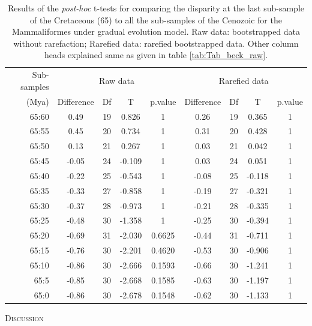 \documentclass[12pt,letterpaper]{article}
\renewcommand{\section}[1]{%
\bigskip
\begin{center}
\begin{Large}
\normalfont\scshape #1
\medskip
\end{Large}
\end{center}}
\begin{document}
\begin{table}[ht]
\caption{Results of the \textit{post-hoc} t-tests for comparing the disparity at the last sub-sample of the Cretaceous (65) to all the sub-samples of the Cenozoic for the Mammaliformes \citep[data from][]{Slater2012MEE} under gradual evolution model. Raw data: bootstrapped data without rarefaction; Rarefied data: rarefied bootstrapped data. Other column heads explained same as given in table \ref{tab:Tab_beck_raw}.}
\label{tab:Tab_slater}
\centering
\begin{tabular}{r|cccc|cccc}
  \hline
  Sub-samples & \multicolumn{4}{c|}{Raw data} & \multicolumn{4}{c}{Rarefied data} \\
  (Mya) & Difference & Df & T & p.value & Difference & Df & T & p.value \\ 
  \hline
  65:60 & 0.49  & 19 & 0.826  & 1      & 0.26  & 19 & 0.365  & 1 \\ 
  65:55 & 0.45  & 20 & 0.734  & 1      & 0.31  & 20 & 0.428  & 1 \\ 
  65:50 & 0.13  & 21 & 0.267  & 1      & 0.03  & 21 & 0.042  & 1 \\ 
  65:45 & -0.05 & 24 & -0.109 & 1      & 0.03  & 24 & 0.051  & 1 \\ 
  65:40 & -0.22 & 25 & -0.543 & 1      & -0.08 & 25 & -0.118 & 1 \\ 
  65:35 & -0.33 & 27 & -0.858 & 1      & -0.19 & 27 & -0.321 & 1 \\ 
  65:30 & -0.37 & 28 & -0.973 & 1      & -0.21 & 28 & -0.335 & 1 \\ 
  65:25 & -0.48 & 30 & -1.358 & 1      & -0.25 & 30 & -0.394 & 1 \\ 
  65:20 & -0.69 & 31 & -2.030 & 0.6625 & -0.44 & 31 & -0.711 & 1 \\ 
  65:15 & -0.76 & 30 & -2.201 & 0.4620 & -0.53 & 30 & -0.906 & 1 \\ 
  65:10 & -0.86 & 30 & -2.666 & 0.1593 & -0.66 & 30 & -1.241 & 1 \\ 
  65:5  & -0.85 & 30 & -2.668 & 0.1585 & -0.63 & 30 & -1.197 & 1 \\ 
  65:0  & -0.86 & 30 & -2.678 & 0.1548 & -0.62 & 30 & -1.133 & 1 \\ 
   \hline
\end{tabular}
\end{table}

%
%

\section{Discussion}
\end{document}
